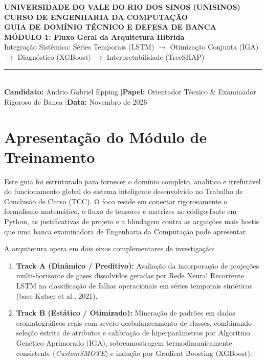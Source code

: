 \documentclass[11pt,a4paper]{article}
\begin{document}
\begin{center}
  {\large\textbf{\textsf{UNIVERSIDADE DO VALE DO RIO DOS SINOS (UNISINOS)}}}\\[0.2cm]
  {\normalsize\textbf{\textsf{CURSO DE ENGENHARIA DA COMPUTAÇÃO}}}\\[0.4cm]
  {\LARGE\textbf{\textcolor{NavyBlue}{\textsf{GUIA DE DOMÍNIO TÉCNICO E DEFESA DE BANCA}}}}\\[0.2cm]
  {\Large\textbf{\textsf{MÓDULO 1: Fluxo Geral da Arquitetura Híbrida}}}\\[0.2cm]
  {\normalsize\textsf{Integração Sistêmica: Séries Temporais (LSTM) $\longrightarrow$ Otimização Conjunta (IGA) $\longrightarrow$ Diagnóstico (XGBoost) $\longrightarrow$ Interpretabilidade (TreeSHAP)}}\\[0.4cm]
  \rule{\textwidth}{1pt}\\[0.2cm]
  \small\textbf{Candidato:} Andrio Gabriel Epping \quad$|$\quad \textbf{Papel:} Orientador Técnico \& Examinador Rigoroso de Banca \quad$|$\quad \textbf{Data:} Novembro de 2026
\end{center}
\vspace{0.4cm}

\section*{Apresentação do Módulo de Treinamento}
Este guia foi estruturado para fornecer o domínio completo, analítico e irrefutável do funcionamento global do sistema inteligente desenvolvido no Trabalho de Conclusão de Curso (TCC). O foco reside em conectar rigorosamente o formalismo matemático, o fluxo de tensores e matrizes no código-fonte em Python, as justificativas de projeto e a blindagem contra as arguições mais hostis que uma banca examinadora de Engenharia da Computação pode apresentar.

A arquitetura opera em dois eixos complementares de investigação:
\begin{enumerate}[leftmargin=1.5cm,label=\textbf{\Roman*.}]
  \item \textbf{Track A (Dinâmico / Preditivo):} Avaliação da incorporação de projeções multi-horizonte de gases dissolvidos geradas por Rede Neural Recorrente LSTM na classificação de falhas operacionais em séries temporais sintéticas (base Katser et al., 2021).
  \item \textbf{Track B (Estático / Otimizado):} Mineração de padrões em dados cromatográficos reais com severo desbalanceamento de classes, combinando seleção estrita de atributos e calibração de hiperparâmetros por Algoritmo Genético Aprimorado (IGA), sobreamostragem termodinamicamente consistente (\textit{CustomSMOTE}) e indução por Gradient Boosting (XGBoost).
\end{enumerate}
\end{document}
